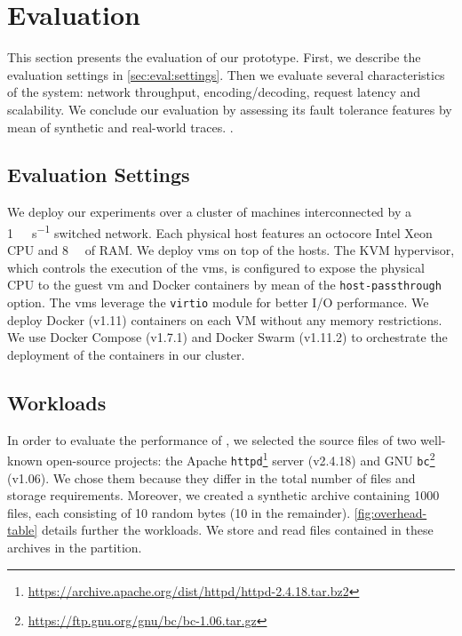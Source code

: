 

\section{Evaluation}
\label{sec:evaluation}

This section presents the evaluation of our \SYS prototype. 
First, we describe the evaluation settings in \autoref{sec:eval:settings}.
Then we evaluate several characteristics of the system: network throughput, encoding/decoding, request latency and scalability.
We conclude our evaluation by assessing its fault tolerance features by mean of synthetic and real-world traces.
.

\subsection{Evaluation Settings}
\label{sec:eval:settings}

We deploy our experiments over a cluster of machines interconnected by a \SI{1}{\giga\bit\per\second} switched network.
Each physical host features an octocore Intel Xeon CPU and \SI{8}{\giga\byte} of RAM.
We deploy \acp{vm} on top of the hosts.
The KVM hypervisor, which controls the execution of the \acp{vm}, is configured to expose the physical CPU to the guest \ac{vm} and Docker containers by mean of the \texttt{host-passthrough} option.
The \acp{vm} leverage the \texttt{virtio} module for better I/O performance.
We deploy Docker (v1.11) containers on each VM without any memory restrictions.
We use Docker Compose (v1.7.1) and Docker Swarm (v1.11.2) to orchestrate the deployment of the containers in our cluster.

\subsection{Workloads}
\label{sec:eval:workloads}
In order to evaluate the performance of \SYS, we selected the source files of two well-known open-source projects: the Apache \texttt{httpd}\footnote{\url{https://archive.apache.org/dist/httpd/httpd-2.4.18.tar.bz2}} server (v2.4.18) and GNU \texttt{bc}\footnote{\url{https://ftp.gnu.org/gnu/bc/bc-1.06.tar.gz}} (v1.06). 
We chose them because they differ in the total number of files and storage requirements.
Moreover, we created a synthetic archive containing 1000 files, each consisting of 10 random bytes (\SI{10}{\byte} in the remainder).
\autoref{fig:overhead-table} details further the workloads.
We store and read files contained in these archives in the \SYS partition. 

